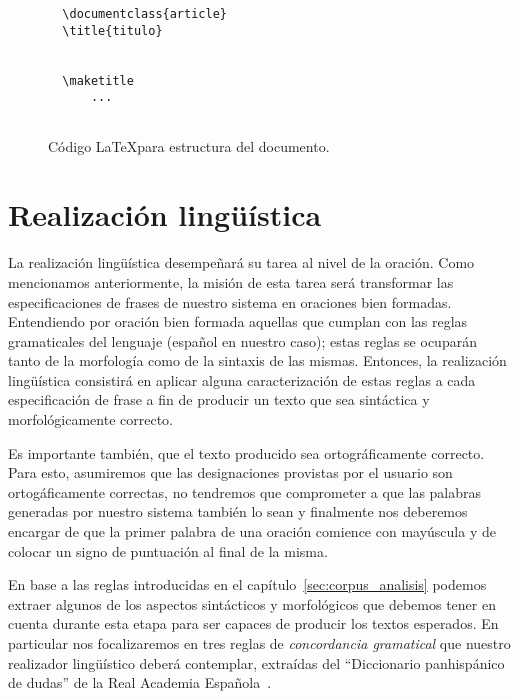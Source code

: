 \begin{figure}[H]
  \begin{verbatim}
  \documentclass{article}
  \title{titulo}
  
  
  \maketitle
      ...
  
  \end{verbatim}
  \caption{Código \LaTeX para estructura del documento.}
  \label{fig:ej_latex2}
\end{figure}


\section{Realización lingüística}
\label{cap:linguistic_realization}


La realización lingüística desempeñará su tarea al nivel de la oración. Como mencionamos anteriormente, la misión de esta tarea será transformar las especificaciones de frases de nuestro sistema en oraciones bien formadas. Entendiendo por oración bien formada aquellas que cumplan con las reglas gramaticales del lenguaje (español en nuestro caso); estas reglas se ocuparán tanto de la morfología como de la sintaxis de las mismas. Entonces, la realización lingüística consistirá en aplicar alguna caracterización de estas reglas a cada especificación de frase a fin de producir un texto que sea sintáctica y morfológicamente correcto.

Es importante también, que el texto producido sea ortográficamente correcto. Para esto, asumiremos que las designaciones provistas por el usuario son ortogáficamente correctas, no tendremos que comprometer a que las palabras generadas por nuestro sistema también lo sean y finalmente nos deberemos encargar de que la primer palabra de una oración comience con mayúscula y de colocar un signo de puntuación al final de la misma.

En base a las reglas introducidas en el capítulo~\ref{sec:corpus_analisis} podemos extraer algunos de los aspectos sintácticos y morfológicos que debemos tener en cuenta durante esta etapa para ser capaces de producir los textos esperados. En particular nos focalizaremos en tres reglas de \emph{concordancia gramatical} que nuestro realizador lingüístico deberá contemplar, extraídas del ``Diccionario panhispánico de dudas'' de la Real Academia Española~\cite{???}.


